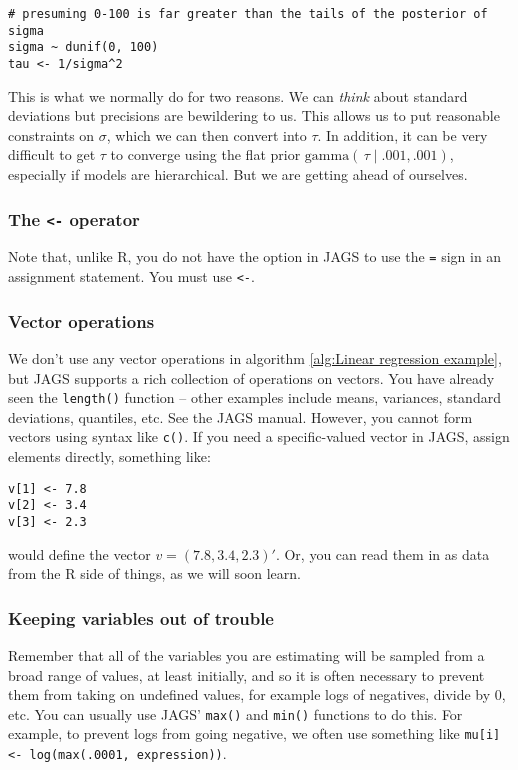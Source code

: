 \documentclass[12pt,english]{article}
\begin{document}
\begin{Verbatim}
# presuming 0-100 is far greater than the tails of the posterior of sigma
sigma ~ dunif(0, 100) 
tau <- 1/sigma^2
\end{Verbatim}

\noindent This is what we normally do for two reasons. We can \emph{think} about standard deviations but precisions are bewildering to us. This allows us to put reasonable constraints on $\sigma$, which we can then convert into $\tau$. In addition, it can be very difficult to get $\tau$ to converge using the flat prior $\textrm{gamma}(\,\tau \mid .001,.001)$, especially if models are hierarchical. But we are getting ahead of ourselves.

\subsubsection{The \texttt{<-} operator}

Note that, unlike R, you do not have the option in JAGS to use the \texttt{=} sign in an assignment statement. You must use \texttt{<-}. 

\subsubsection{Vector operations}

We don't use any vector operations in algorithm \ref{alg:Linear regression example}, but JAGS supports a rich collection of operations on vectors. You have already seen the \texttt{length()} function -- other examples include means, variances, standard deviations, quantiles, etc. See the JAGS manual. However, you cannot form vectors using syntax like \texttt{c()}. If you need a specific-valued vector in JAGS, assign elements directly, something like:

\begin{Verbatim}
v[1] <- 7.8
v[2] <- 3.4
v[3] <- 2.3
\end{Verbatim}

\noindent would define the vector $v=(7.8,3.4,2.3)'$. Or, you can read them in as data from the R side of things, as we will soon learn.

\subsubsection{Keeping variables out of trouble}

Remember that all of the variables you are estimating will be sampled from a broad range of values, at least initially, and so it is often necessary to prevent them from taking on undefined values, for example logs of negatives, divide by 0, etc. You can usually use JAGS' \texttt{max()} and \texttt{min()} functions to do this. For example, to prevent logs from going negative, we often use something like \texttt{mu[i] <- log(max(.0001, expression))}.
\end{document}

